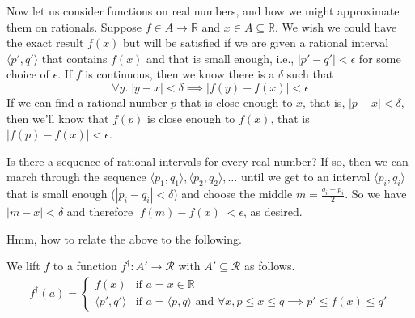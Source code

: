 \documentclass{article}
\newcommand{\Reals}[0]{\mathbb{R}}
\begin{document}


Now let us consider functions on real numbers, and how we might
approximate them on rationals. Suppose $f \in A \to \Reals$ and $x \in
A \subseteq \Reals$. We wish we could have the exact result $f(x)$ but
will be satisfied if we are given a rational interval $\langle p', q'
\rangle$ that contains $f(x)$ and that is small enough, i.e., $|p' -
q'| < \epsilon$ for some choice of $\epsilon$.  If $f$ is continuous,
then we know there is a $\delta$ such that
\[
  \forall y.\; |y-x| < \delta \implies |f(y) - f(x)| < \epsilon
\]
If we can find a rational number $p$ that is close enough to $x$, that
is, $|p-x| < \delta$, then we'll know that $f(p)$ is close enough to
$f(x)$, that is $|f(p) - f(x)| < \epsilon$. 

Is there a sequence of rational intervals for every real number?  If
so, then we can march through the sequence $\langle p_1,q_1 \rangle,
\langle p_2,q_2 \rangle, \ldots$ until we get to an interval $\langle
p_i,q_i \rangle$ that is small enough ($|p_i - q_i| < \delta$) and
choose the middle $m=\frac{q_i - p_i}{2}$. So we have $|m - x| <
\delta$ and therefore $|f(m) - f(x)| < \epsilon$, as desired.








Hmm, how to relate the above to the following.

We lift $f$ to a function $f^\dagger : A' \to \mathcal{R}$ with $A'
\subseteq \mathcal{R}$ as follows.
\begin{align*}
  f^\dagger(a) = 
  \begin{cases}
    f(x) & \text{if } a=x \in \Reals \\
    \langle p',q' \rangle & \text{if } a = \langle p,q \rangle \text{ and }
         \forall x, p \leq x \leq q \implies p' \leq f(x) \leq q'
  \end{cases}
\end{align*}
\end{document}
